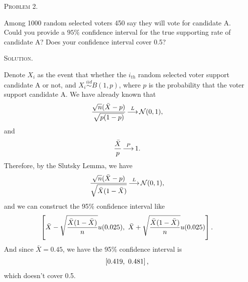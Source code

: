 \documentclass{article}
\begin{document}
\begin{CJK}{UTF8}{gbsn}
    \begin{shaded}
        \noindent\textsc{Problem 2.}\par
        Among 1000 random selected voters 450 say they will vote for candidate A. Could you provide a $95\%$
        confidence interval for the true supporting rate of candidate A? Does your confidence interval cover 0.5?
    \end{shaded}
    \noindent\textsc{Solution.}\par
    Denote $X_i$ as the event that whether the $i_{th}$ random selected voter support candidate A or not,
    and $X_i \mathop{\sim}\limits^{iid} B(1, p)$, where $p$ is the probability that the voter support candidate A.
    We have already known that
    \begin{align}
        \frac{\sqrt{n}(\bar{X}-p)}{\sqrt{p(1-p)}} \mathop{\longrightarrow}\limits^{L} {\mathcal N}(0, 1),\notag
    \end{align}
    and
    \begin{align}
        \frac{\bar{X}}{p} \mathop{\longrightarrow}\limits^{P} 1.\notag
    \end{align}
    Therefore, by the Slutsky Lemma, we have
    \begin{align}
        \frac{\sqrt{n}(\bar{X}-p)}{\sqrt{\bar{X}(1-\bar{X})}} \mathop{\longrightarrow}\limits^{L} {\mathcal N}(0, 1),\notag
    \end{align}
    and we can construct the 95$\%$ confidence interval like
    \begin{align}
        \left [ \bar{X} - \sqrt{\frac{\bar{X}(1-\bar{X})}{n}}u(0.025), \,\, \bar{X} + \sqrt{\frac{\bar{X}(1-\bar{X})}{n}}u(0.025) \right ].\notag
    \end{align}
    And since $\bar{X}=0.45$, we have the 95$\%$ confidence interval is
    \begin{align}
        \left [ 0.419, \,\, 0.481  \right ],\notag
    \end{align}
    which doesn't cover 0.5.



\end{CJK}
\end{document}
